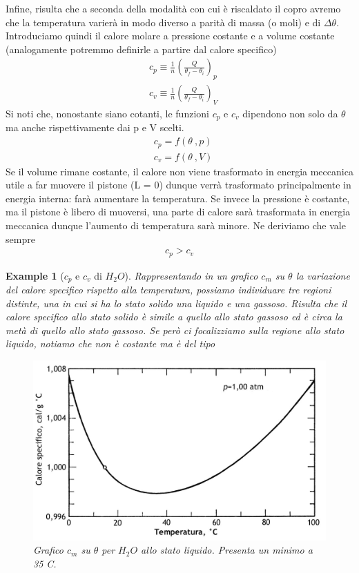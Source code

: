 \documentclass[10pt,a4paper]{article}
\newtheorem{example}{Example}
\begin{document}
Infine, risulta che a seconda della modalità con cui è riscaldato il copro avremo che la temperatura varierà in modo diverso a parità di massa (o moli) e di $\Delta \theta$. Introduciamo quindi il calore molare a pressione costante e a volume costante (analogamente potremmo definirle a partire dal calore specifico)
\begin{align*} 
	&c_p \equiv \frac{1}{n} \left(\frac{Q}{\theta_f - \theta_i}\right)_p \\
	&c_v \equiv \frac{1}{n} \left(\frac{Q}{\theta_f - \theta_i}\right)_V
\end{align*} 
Si noti che, nonostante siano cotanti, le funzioni $c_p$ e $c_v$ dipendono non solo da $\theta$ ma anche rispettivamente dai p e V scelti. 
\begin{align*} 
	&c_p = f(\theta\ , p)\\
	&c_v = f(\theta\ , V)
\end{align*} 
Se il volume rimane costante, il calore non viene trasformato in energia meccanica utile a far muovere il pistone (L = 0) dunque verrà trasformato principalmente in energia interna: farà aumentare la temperatura. Se invece la pressione è costante, ma il pistone è libero di muoversi, una parte di calore sarà trasformata in energia meccanica dunque l'aumento di temperatura sarà minore. Ne deriviamo che vale sempre
\begin{align*} 
	c_p > c_v
\end{align*}  
\begin{example}[$c_p$ e $c_v$ di $H_2 O$]
Rappresentando in un grafico $c_m$ su $\theta$ la variazione del calore specifico rispetto alla temperatura, possiamo individuare tre regioni distinte, una in cui si ha lo stato solido una liquido e una gassoso. Risulta che il calore specifico allo stato solido è simile a quello allo stato gassoso ed è circa la metà di quello allo stato gassoso. Se però ci focalizziamo sulla regione allo stato liquido, notiamo che non è costante ma è del tipo
\begin{figure}[h!]
	\centering
	\includegraphics[width=0.7\linewidth]{"../images/calore specifico acqua"}
	\caption{Grafico $c_m$ su $\theta$ per $H_2O$ allo stato liquido. Presenta un minimo a 35 \textdegree C.}
	\label{fig:calore-specifico-acqua}
\end{figure}
\FloatBarrier
\end{example}
\end{document}

